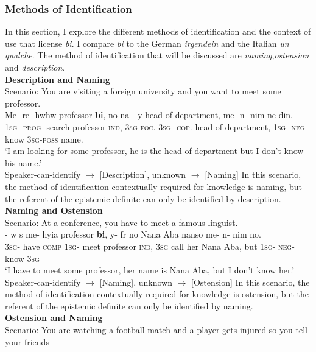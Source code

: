 \documentclass[output=paper,
modfonts
]{langsci/langscibook}
\begin{document}
\subsubsection{Methods of Identification}
In this section, I explore the different methods of identification and the context of use that license \emph{bi}. I compare \emph{bi} to the German \emph{irgendein} and the Italian \emph{un qualche}. The method of identification that will be discussed are \emph{naming},\emph{ostension} and \emph{description}. \\
\textbf{Description and Naming}\\
Scenario: You are visiting a foreign university and you want to meet some professor. 
\ea\label{ex45}\\
\gll Me- re- hwhw professor \textbf{bi}, no na - y head of department, me- n- nim ne din.\\
\textsc{1sg}- \textsc{prog}- search professor \textsc{ind}, \textsc{3sg} \textsc{foc}. \textsc{3sg}- \textsc{cop}. head of department, \textsc{1sg}- \textsc{neg}- know \textsc{3sg}-\textsc{poss} name.\\
\glt `I am looking for some professor, he is the head of department but I don't know his name.'\\
	Speaker-can-identify $\rightarrow$ [Description], unknown $\rightarrow$  [Naming]
 \z  In this scenario, the method of identification contextually required for knowledge is naming, but the referent of the epistemic definite can only be identified by description. \\
\textbf{Naming and Ostension}\\
Scenario: At a conference, you have to meet a famous linguist.
\ea\label{ex45}\\
\gll {}- w  s me- hyia professor \textbf{bi}, y- fr no Nana Aba nanso me- n- nim no.\\
\textsc{3sg}- have \textsc{comp} \textsc{1sg}- meet professor \textsc{ind}, \textsc{3sg} call her Nana Aba, but \textsc{1sg}- \textsc{neg}- know \textsc{3sg}\\
\glt `I have to meet some professor, her name is Nana Aba, but I don't know her.'\\
	Speaker-can-identify $\rightarrow$ [Naming], unknown $\rightarrow$  [Ostension]
 \z In this scenario, the method of identification contextually required for knowledge is ostension, but the referent of the epistemic definite can only be identified by naming. \\
\textbf{Ostension and Naming}\\
 Scenario: You are watching a football match and a player gets injured so you tell your friends
\end{document}
